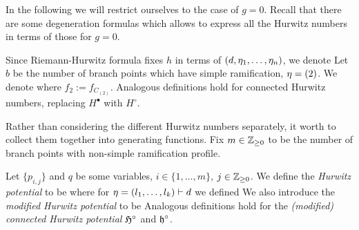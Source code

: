 \documentclass[10pt]{beamer}
\begin{document}
\begin{frame}

In the following we will restrict ourselves to the case of $g=0$. Recall that there are some degeneration formulas which allows to express all the Hurwitz numbers in terms of those for $g=0$.  

Since Riemann-Hurwitz formula fixes $h$ in terms of $(d,\eta_1,\ldots,\eta_n)$, we denote
Let $b$ be the number of branch points which have simple ramification, \ie $\eta=(2)$. We denote
\vspace{-10pt}
where $f_2:=f_{C_{(2)}}$. Analogous definitions hold for connected Hurwitz numbers, replacing $H^\bullet$ with $H^\circ$. 

\end{frame}

\begin{frame}

Rather than considering the different Hurwitz numbers separately, it worth to collect them together into generating functions. Fix $m\in\mathbb Z_{\geq0}$ to be the number of branch points with non-simple ramification profile.

\begin{definition}
	Let $\{p_{i,j}\}$ and $q$ be some variables, $i\in\{1,\ldots,m\}$, $j\in\mathbb Z_{\geq0}$. We define the \emph{Hurwitz potential} to be
	where for $\eta=(l_1,\ldots,l_k)\vdash d$ we defined
	We also introduce the \emph{modified Hurwitz potential} to be
	\vspace{-2pt}
	Analogous definitions hold for the \emph{(modified) connected Hurwitz potential} $\mathfrak H^\circ$ and $\mathfrak h^\circ$. 
\end{definition}

\end{frame}
\end{document}
